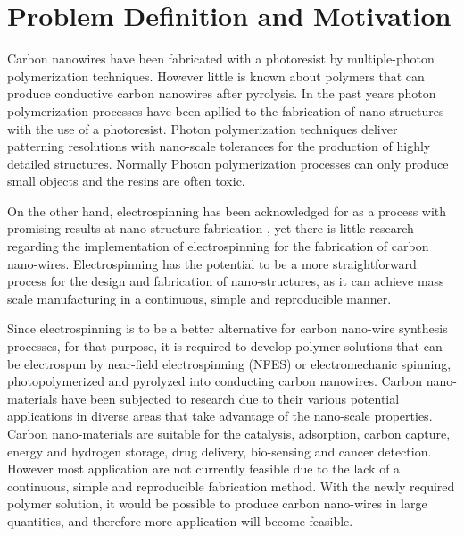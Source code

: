 
\chapter{Problem Definition and Motivation} %

\label{Chapter:ProblemDefinitionandMotivation}


Carbon nanowires have been fabricated with a photoresist by multiple-photon polymerization techniques. However little is known about polymers that can produce conductive carbon nanowires after pyrolysis. In the past years photon polymerization processes have been apllied to the fabrication of nano-structures with the use of a photoresist. \cite{Boer2014} Photon polymerization techniques deliver patterning resolutions with nano-scale tolerances for the production of highly detailed structures. \cite{Hribar2014} Normally Photon polymerization processes can only produce small objects and the resins are often toxic. \cite{Ovsianikov2012}

On the other hand, electrospinning has been acknowledged for as a process with promising results at nano-structure fabrication \cite{Boer2014}, yet there is little research regarding the implementation of electrospinning for the fabrication of carbon nano-wires. Electrospinning has the potential to be a more straightforward process for the design and fabrication of nano-structures, as it can achieve mass scale manufacturing in a continuous, simple and reproducible manner.

Since electrospinning is to be a better alternative for carbon nano-wire synthesis processes, for that purpose, it is required to develop polymer solutions that can be electrospun by near-field electrospinning (NFES) or electromechanic spinning, photopolymerized and pyrolyzed into conducting carbon nanowires. Carbon nano-materials have been subjected to research due to their various potential applications in diverse areas that take advantage of the nano-scale properties. \cite{Siddiqui2019} Carbon nano-materials are suitable for the catalysis, adsorption, carbon capture, energy and hydrogen storage, drug delivery, bio-sensing and cancer detection. \cite{Siddiqui2019} However most application are not currently feasible  due to the lack of a continuous, simple and reproducible fabrication method. With the newly required polymer solution, it would be possible to produce carbon nano-wires in large quantities, and therefore more application will become feasible.










